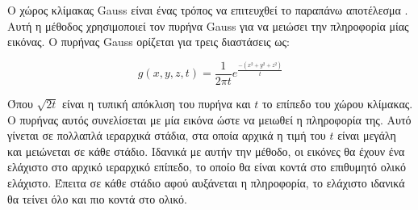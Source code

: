 \documentclass[a4paper,12pt]{article}
\begin{document}
Ο χώρος κλίμακας Gauss είναι ένας τρόπος να επιτευχθεί το παραπάνω αποτέλεσμα
\cite{scale_space:1}. Αυτή η μέθοδος χρησιμοποιεί τον πυρήνα Gauss για να
μειώσει την πληροφορία μίας εικόνας. Ο πυρήνας Gauss ορίζεται για τρεις
διαστάσεις ως:

\begin{equation*}
    g(x,y,z,t) = \frac{1} {2 \pi t} e^{\frac{-(x^2 + y^2 + z^2) }{t}}
\end{equation*}

Όπου $\sqrt{2t}$ είναι η τυπική απόκλιση του πυρήνα και $t$ το επίπεδο του χώρου
κλίμακας. Ο πυρήνας αυτός συνελίσεται με μία εικόνα ώστε να μειωθεί η πληροφορία
της. Αυτό γίνεται σε πολλαπλά ιεραρχικά στάδια, στα οποία αρχικά η τιμή του $t$
είναι μεγάλη και μειώνεται σε κάθε στάδιο. Ιδανικά με αυτήν την μέθοδο, οι
εικόνες θα έχουν ένα ελάχιστο στο αρχικό ιεραρχικό επίπεδο, το οποίο θα είναι
κοντά στο επιθυμητό ολικό ελάχιστο. Έπειτα σε κάθε στάδιο αφού αυξάνεται η
πληροφορία, το ελάχιστο ιδανικά θα τείνει όλο και πιο κοντά στο ολικό.
\end{document}
